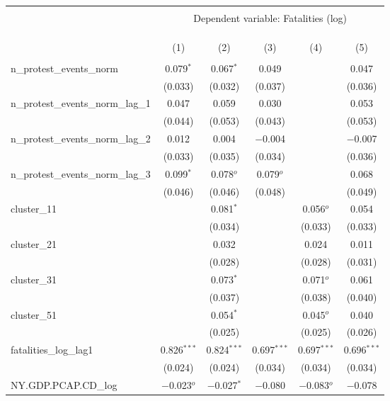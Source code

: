 
\begin{tabular}{@{\extracolsep{5pt}}lccccc} 
\\[-1.8ex]\hline 
\hline \\[-1.8ex] 
 & \multicolumn{5}{c}{Dependent variable: Fatalities (log)} \\ 
\cline{2-6} 
\\[-1.8ex] & \multicolumn{5}{c}{ } \\ 
\\[-1.8ex] & (1) & (2) & (3) & (4) & (5)\\ 
\hline \\[-1.8ex] 
 n\_protest\_events\_norm & 0.079$^{*}$ & 0.067$^{*}$ & 0.049 &  & 0.047 \\ 
  & (0.033) & (0.032) & (0.037) &  & (0.036) \\ 
  n\_protest\_events\_norm\_lag\_1 & 0.047 & 0.059 & 0.030 &  & 0.053 \\ 
  & (0.044) & (0.053) & (0.043) &  & (0.053) \\ 
  n\_protest\_events\_norm\_lag\_2 & 0.012 & 0.004 & $-$0.004 &  & $-$0.007 \\ 
  & (0.033) & (0.035) & (0.034) &  & (0.036) \\ 
  n\_protest\_events\_norm\_lag\_3 & 0.099$^{*}$ & 0.078$^{o}$ & 0.079$^{o}$ &  & 0.068 \\ 
  & (0.046) & (0.046) & (0.048) &  & (0.049) \\ 
  cluster\_11 &  & 0.081$^{*}$ &  & 0.056$^{o}$ & 0.054 \\ 
  &  & (0.034) &  & (0.033) & (0.033) \\ 
  cluster\_21 &  & 0.032 &  & 0.024 & 0.011 \\ 
  &  & (0.028) &  & (0.028) & (0.031) \\ 
  cluster\_31 &  & 0.073$^{*}$ &  & 0.071$^{o}$ & 0.061 \\ 
  &  & (0.037) &  & (0.038) & (0.040) \\ 
  cluster\_51 &  & 0.054$^{*}$ &  & 0.045$^{o}$ & 0.040 \\ 
  &  & (0.025) &  & (0.025) & (0.026) \\ 
  fatalities\_log\_lag1 & 0.826$^{***}$ & 0.824$^{***}$ & 0.697$^{***}$ & 0.697$^{***}$ & 0.696$^{***}$ \\ 
  & (0.024) & (0.024) & (0.034) & (0.034) & (0.034) \\ 
  NY.GDP.PCAP.CD\_log & $-$0.023$^{o}$ & $-$0.027$^{*}$ & $-$0.080 & $-$0.083$^{o}$ & $-$0.078 \\ 

\end{tabular}
